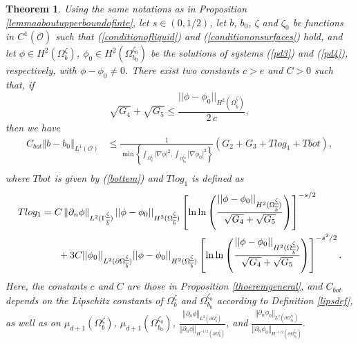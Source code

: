\documentclass[11pt]{article}
\newtheorem{theorem}{Theorem}
\begin{document}
\begin{theorem}\label{stabilitytheorem}
	 Using the same notations as in Proposition \ref{lemmaaboutupperboundofinte},  let  $s \in (0,1/2)$, let $b$, $b_0$, $\zeta$ and $\zeta_0$ be functions in $C^1\left(\overline{\mathcal O }\right)$ such that (\ref{conditionofliquid}) and (\ref{conditiononsurfaces}) hold, and  let $\phi\in H^2(\Omega^{\zeta}_{b})$, $\phi_0\in H^2(\Omega^{\zeta_0}_{b_0})$ be the solutions of systems (\ref{pd3}) and (\ref{pd4}), respectively, with $\phi-\phi_0\neq 0$. There exist two constants $c> e$ and $C>0$ such that, if 
	$$ \sqrt{G_4}+\sqrt{G_5}\leq\frac{||\phi-\phi_0||_{H^2(\Omega_{\overline{b}}^{\underline{\zeta}})}}{2\,c}, $$
	then we have
	\begin{equation}\label{inequalitytheorems}
		\begin{split}
			C_{bot}\left\Vert b-b_0\right\Vert_{L^1(\mathcal O )}
			&\leq \frac{1}{\min\left\{ \displaystyle\int_{\Omega_b^{\zeta}} |\nabla\phi|^2,\displaystyle\int_{\Omega_{b_0}^{\zeta_0}} |\nabla\phi_0|^2  \right\}}\left(G_2+G_3+Tlog_1+Tbot\right) ,\\
		\end{split}
	\end{equation}
	where $Tbot$ is given by (\ref{bottem}) and   $Tlog_1$  is defined  as
	\begin{equation}\label{logterm1}
		\begin{split}
			Tlog_1&=C \left\Vert \partial_n \phi\right\Vert_{L^{2}(\Gamma_{\overline{b}}^{\underline{\zeta}} )}||\phi-\phi_0||_{H^2(\Omega_{\overline{b}}^{\underline{\zeta}})}  \left[  \ln\ln\left(   \dfrac{||\phi-\phi_0||_{H^2(\Omega_{\overline{b}}^{\underline{\zeta}})} }{\sqrt{G_4}+\sqrt{G_5} }    \right)      \right]^{-s/2}\\&\hspace{0.6cm}+3C || \phi_0||_{L^2(\partial\Omega_{\overline{b}}^{\underline{\zeta}})}||\phi-\phi_0||_{H^2(\Omega_{\overline{b}}^{\underline{\zeta}})} \left[  \ln\ln\left(   \dfrac{||\phi-\phi_0||_{H^2(\Omega_{\overline{b}}^{\underline{\zeta}})} }{\sqrt{G_4}+\sqrt{G_5}}     \right)      \right]^{-s^2/2}.
		\end{split}
	\end{equation}
	Here, the constants  $c$ and $C$ are those in Proposition \ref{thoeremgeneral}, and  $C_{bot}$ depends on the Lipschitz constants of $\Omega_{b}^{\zeta}$ and $\Omega_{b_0}^{\zeta_0}$ according to Definition \ref{lipsdef}, as well as on $\mu_{d+1} \left(\Omega_{b}^{\zeta}\right)$, $\mu_{d+1} \left(\Omega_{b_0}^{\zeta_0}\right)$, 
	$\frac{\left\Vert\partial_n\phi\right\Vert_{L^2(\partial\Omega_{b}^{\zeta})}}{\left\Vert\partial_n\phi\right\Vert_{H^{-1/2}(\partial\Omega_{b}^{\zeta})}}$, 
	and $\frac{\left\Vert\partial_n\phi_0\right\Vert_{L^2(\partial\Omega_{b_0}^{\zeta_0})}}{\left\Vert\partial_n\phi_0\right\Vert_{H^{-1/2}(\partial\Omega_{b_0}^{\zeta_0})}}$.
	
\end{theorem}
\end{document}
